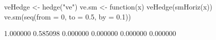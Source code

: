 \begin{Schunk}
% --begin: "hedge"
\begin{Sinput}
 veHedge <- hedge("ve")
 ve.sm <- function(x) veHedge(smHoriz(x))
 ve.sm(seq(from = 0, to = 0.5, by = 0.1))
\end{Sinput}
\begin{Soutput}
[1] 1.000000 0.585098 0.000000 0.000000 0.000000 0.000000
\end{Soutput}
%
% --end: "hedge"
\end{Schunk}
